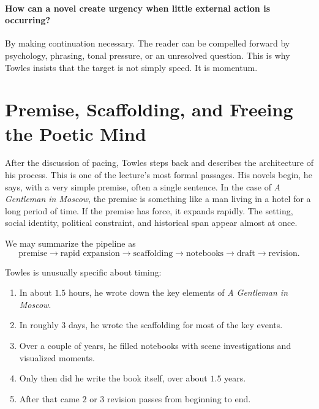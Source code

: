 \paragraph{How can a novel create urgency when little external action is occurring?}

By making continuation necessary. The reader can be compelled forward by psychology, phrasing, tonal pressure, or an unresolved question. This is why Towles insists that the target is not simply speed. It is momentum.

\section{Premise, Scaffolding, and Freeing the Poetic Mind}

After the discussion of pacing, Towles steps back and describes the architecture of his process. This is one of the lecture's most formal passages. His novels begin, he says, with a very simple premise, often a single sentence. In the case of \emph{A Gentleman in Moscow}, the premise is something like a man living in a hotel for a long period of time. If the premise has force, it expands rapidly. The setting, social identity, political constraint, and historical span appear almost at once.

We may summarize the pipeline as
\begin{equation}
\text{premise} \longrightarrow \text{rapid expansion} \longrightarrow \text{scaffolding} \longrightarrow \text{notebooks} \longrightarrow \text{draft} \longrightarrow \text{revision}.
\end{equation}

Towles is unusually specific about timing:
\begin{enumerate}
\item In about \(1.5\) hours, he wrote down the key elements of \emph{A Gentleman in Moscow}.
\item In roughly \(3\) days, he wrote the scaffolding for most of the key events.
\item Over a couple of years, he filled notebooks with scene investigations and visualized moments.
\item Only then did he write the book itself, over about \(1.5\) years.
\item After that came \(2\) or \(3\) revision passes from beginning to end.
\end{enumerate}

